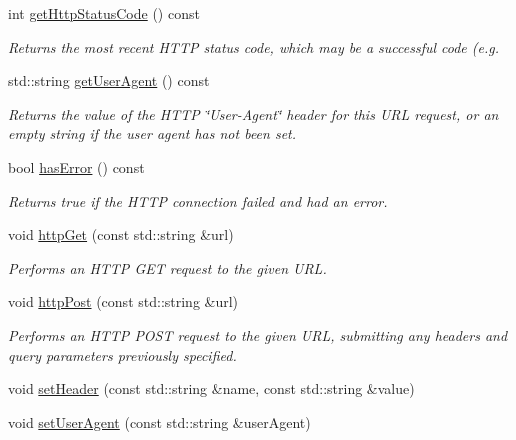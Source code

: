 \begin{DoxyCompactItemize}
int \mbox{\hyperlink{classsgl_1_1GDownloader_ab6c069ef77f1319830dcfd90eed6a2ce}{get\+Http\+Status\+Code}} () const
\begin{DoxyCompactList}\small\item\em Returns the most recent H\+T\+TP status code, which may be a successful code (e.\+g. \end{DoxyCompactList}\item 
std\+::string \mbox{\hyperlink{classsgl_1_1GDownloader_a479f109234aad1c792be804bf6320c62}{get\+User\+Agent}} () const
\begin{DoxyCompactList}\small\item\em Returns the value of the H\+T\+TP \char`\"{}\+User-\/\+Agent\char`\"{} header for this U\+RL request, or an empty string if the user agent has not been set. \end{DoxyCompactList}\item 
bool \mbox{\hyperlink{classsgl_1_1GDownloader_a81dd125e253592aaef5fea33dfc50c42}{has\+Error}} () const
\begin{DoxyCompactList}\small\item\em Returns true if the H\+T\+TP connection failed and had an error. \end{DoxyCompactList}\item 
void \mbox{\hyperlink{classsgl_1_1GDownloader_a4bafb98a98bc6edc2403a3734c985618}{http\+Get}} (const std\+::string \&url)
\begin{DoxyCompactList}\small\item\em Performs an H\+T\+TP G\+ET request to the given U\+RL. \end{DoxyCompactList}\item 
void \mbox{\hyperlink{classsgl_1_1GDownloader_a68ec0a089bf1b625b86753545e952a57}{http\+Post}} (const std\+::string \&url)
\begin{DoxyCompactList}\small\item\em Performs an H\+T\+TP P\+O\+ST request to the given U\+RL, submitting any headers and query parameters previously specified. \end{DoxyCompactList}\item 
void \mbox{\hyperlink{classsgl_1_1GDownloader_af7065da3945b84ffb547b8bad9ddf8dc}{set\+Header}} (const std\+::string \&name, const std\+::string \&value)
\item 
void \mbox{\hyperlink{classsgl_1_1GDownloader_a766286050e9b8fe08919f8353ecb4031}{set\+User\+Agent}} (const std\+::string \&user\+Agent)
\end{DoxyCompactItemize}


